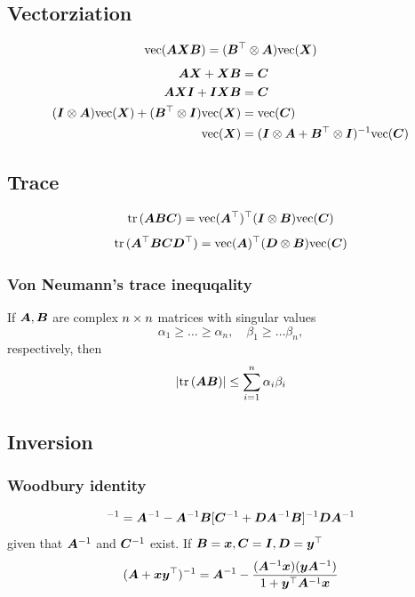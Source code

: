 \documentclass[10pt]{article}
\begin{document}
\subsection{Vectorziation}
\begin{equation}
\text{vec}({\bm{A}} {\bm{X}} {\bm{B}}) = ({\bm{B}}^{\top} \otimes {\bm{A}}) \text{vec}({\bm{X}}) 
\end{equation}
\begin{align}
    {\bm{A}} {\bm{X}} + {\bm{X}} {\bm{B}} &= {\bm{C}} \\ 
    {\bm{A}}{\bm{X}}{\bm{I}}+{\bm{I}}{\bm{X}}{\bm{B}} &= {\bm{C}} \\ 
    ({\bm{I}} \otimes {\bm{A}})\text{vec}({\bm{X}}) + ({\bm{B}}^{\top} \otimes {\bm{I}})\text{vec}({\bm{X}}) &= \text{vec}({\bm{C}}) \\ 
    \text{vec}({\bm{X}}) &= ({\bm{I}} \otimes {\bm{A}} + {\bm{B}}^{\top} \otimes {\bm{I}})^{-1} \text{vec}({\bm{C}}) 
\end{align}
\subsection{Trace}
\begin{equation}
    \mathrm{tr}\, ({\bm{A}} {\bm{B}} {\bm{C}}) = \text{vec}({\bm{A}}^{\top})^{\top} ({\bm{I}} \otimes {\bm{B}})\text{vec}({\bm{C}})
\end{equation}
\begin{equation}
    \mathrm{tr}\, ({\bm{A}}^{\top} {\bm{B}} {\bm{C}} {\bm{D}}^{\top}) = \text{vec}({\bm{A}})^{\top} ({\bm{D}} \otimes {\bm{B}}) \text{vec}({\bm{C}}) 
\end{equation}
\subsubsection{Von Neumann's trace inequqality}
 If ${\bm{A}}, {\bm{B}}$ are complex $n \times n$ matrices with singular values 
\begin{equation}
    \alpha_1 \geq \dots \geq \alpha_n , \quad \beta_1 \geq \dots \beta_n, 
\end{equation}
respectively, then 
\begin{equation}
    \left|\mathrm{tr}\,({\bm{A}}{\bm{B}})\right| \leq \sum_{i=1}^n \alpha_i \beta_i 
\end{equation}
\subsection{Inversion}
\subsubsection{Woodbury identity}
\begin{equation}
    [\mA+\mB\mC\mD]^{-1} = \mA^{-1} - \mA^{-1} \mB [\mC^{-1}+\mD \mA^{-1} \mB]^{-1} \mD \mA^{-1}
\end{equation}
given that ${\bm{A}}^{-1}$ and ${\bm{C}}^{-1}$ exist.
If ${\bm{B}} = {\bm{x}}, {\bm{C}} = {\bm{I}}, {\bm{D}} = {\bm{y}}^{\top}$
\begin{equation}
    ({\bm{A}} + {\bm{x}} {\bm{y}}^{\top})^{-1} = {\bm{A}}^{-1} - \frac{({\bm{A}}^{-1} {\bm{x}})({\bm{y}} {\bm{A}}^{-1})}{1+{\bm{y}}^{\top} {\bm{A}}^{-1} {\bm{x}}}
\end{equation}
\end{document}
